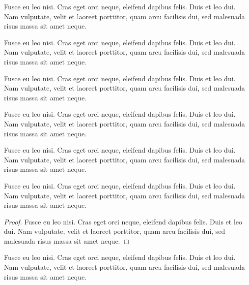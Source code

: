 \documentclass[a4paper,USenglish,cleveref,autoref,thm-restate]{lipics-v2019}
\begin{document}
\begin{note}\label{sec:testenv-note}
Fusce eu leo nisi. Cras eget orci neque, eleifend dapibus felis. Duis et leo dui. Nam vulputate, velit et laoreet porttitor, quam arcu facilisis dui, sed malesuada risus massa sit amet neque.
\end{note}

\begin{note*}
Fusce eu leo nisi. Cras eget orci neque, eleifend dapibus felis. Duis et leo dui. Nam vulputate, velit et laoreet porttitor, quam arcu facilisis dui, sed malesuada risus massa sit amet neque.
\end{note*}

\begin{remark}\label{sec:testenv-remark}
Fusce eu leo nisi. Cras eget orci neque, eleifend dapibus felis. Duis et leo dui. Nam vulputate, velit et laoreet porttitor, quam arcu facilisis dui, sed malesuada risus massa sit amet neque.
\end{remark}

\begin{remark*}
Fusce eu leo nisi. Cras eget orci neque, eleifend dapibus felis. Duis et leo dui. Nam vulputate, velit et laoreet porttitor, quam arcu facilisis dui, sed malesuada risus massa sit amet neque.
\end{remark*}

\begin{claim}\label{sec:testenv-claim}
Fusce eu leo nisi. Cras eget orci neque, eleifend dapibus felis. Duis et leo dui. Nam vulputate, velit et laoreet porttitor, quam arcu facilisis dui, sed malesuada risus massa sit amet neque.
\end{claim}

\begin{claim*}\label{sec:testenv-claim2}
Fusce eu leo nisi. Cras eget orci neque, eleifend dapibus felis. Duis et leo dui. Nam vulputate, velit et laoreet porttitor, quam arcu facilisis dui, sed malesuada risus massa sit amet neque.
\end{claim*}

\begin{proof}
Fusce eu leo nisi. Cras eget orci neque, eleifend dapibus felis. Duis et leo dui. Nam vulputate, velit et laoreet porttitor, quam arcu facilisis dui, sed malesuada risus massa sit amet neque.
\end{proof}

\begin{claimproof}
Fusce eu leo nisi. Cras eget orci neque, eleifend dapibus felis. Duis et leo dui. Nam vulputate, velit et laoreet porttitor, quam arcu facilisis dui, sed malesuada risus massa sit amet neque.
\end{claimproof}
\end{document}
